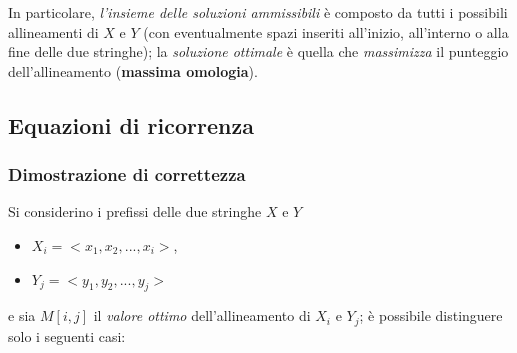     In particolare, \emph{l'insieme delle soluzioni ammissibili} è composto da tutti i possibili allineamenti di $X$ e $Y$ (con eventualmente spazi inseriti all'inizio, all'interno o alla fine delle due stringhe); la \emph{soluzione ottimale} è quella che \emph{massimizza} il punteggio dell'allineamento (\textbf{massima omologia}).
    
\subsection{Equazioni di ricorrenza}
\label{section:needleman-wunsch}
\subsubsection{Dimostrazione di correttezza}
    Si considerino i prefissi delle due stringhe $X$ e $Y$
    \begin{itemize}
        \item $X_i = <x_1, x_2, ..., x_i>$,
        \item $Y_j = <y_1, y_2, ..., y_j>$
    \end{itemize}
    e sia $M[i, j]$ il \emph{valore ottimo} dell'allineamento di $X_{i}$ e $Y_{j}$; è possibile distinguere solo i seguenti casi:
